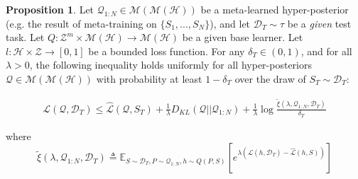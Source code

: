 \documentclass{article}
\theoremstyle{definition}
\newtheorem{proposition}{Proposition}[section]
\newcommand{\Expect}[2]{\mathbb{E}_{#1}\left [#2 \right ]}
\begin{document}
\begin{proposition}
	Let $\mathcal{Q}_{1:N}\in \mathcal{M}(\mathcal{M}(\mathcal{H}))$ be a meta-learned hyper-posterior (e.g. the result of meta-training on $\{S_1,...,S_N\}$), and let $\mathcal{D}_T\sim \tau$ be a \emph{given} test task. Let $Q: \mathcal{Z}^m\times\mathcal{M}(\mathcal{H})\rightarrow \mathcal{M}(\mathcal{H})$ be a given base learner. Let $l: \mathcal{H}\times \mathcal{Z}\rightarrow [0, 1]$ be a bounded loss function.
	For any $\delta_T \in (0,1)$, and for all $\lambda>0$, the following inequality holds uniformly for all hyper-posteriors $\mathcal{Q}\in \mathcal{M}(\mathcal{M}(\mathcal{H}))$ with probability at least $1-\delta_T$ over the draw of $S_T\sim \mathcal{D}_T$:
	
	\begin{align}
	\mathcal{L}(\mathcal{Q}, \mathcal{D}_T) \leq \hat{\mathcal{L}}(\mathcal{Q}, S_T) + \frac{1}{\lambda}D_{KL}(\mathcal{Q}||\mathcal{Q}_{1:N})
	+\frac{1}{\lambda}\log\frac{\tilde{\xi}(\lambda,\mathcal{Q}_{1:N},\mathcal{D}_T)}{\delta_T}
	\end{align}
	
	
	where 
	\begin{equation}\label{eq:tilde_xi}
	\tilde{\xi}(\lambda,\mathcal{Q}_{1:N},\mathcal{D}_T)\triangleq \Expect{S\sim \mathcal{D}_T, P\sim \mathcal{Q}_{1:N}, h\sim Q(P,S)}{e^{\lambda\left (\mathcal{L}(h, \mathcal{D}_T)-\hat{\mathcal{L}}(h, S)\right )}}
	\end{equation}
\end{proposition}
\end{document}
